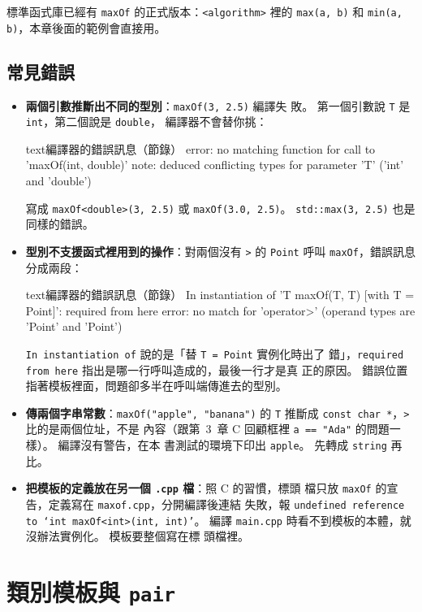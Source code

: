 標準函式庫已經有 \texttt{maxOf} 的正式版本：\texttt{<algorithm>} 裡的
\texttt{max(a, b)} 和 \texttt{min(a, b)}，本章後面的範例會直接用。

\subsection{常見錯誤}

\begin{itemize}
\item \textbf{兩個引數推斷出不同的型別}：\texttt{maxOf(3, 2.5)} 編譯失
敗。 第一個引數說 \texttt{T} 是 \texttt{int}，第二個說是 \texttt{double}，
編譯器不會替你挑：
\begin{code}{text}{編譯器的錯誤訊息（節錄）}
error: no matching function for call to 'maxOf(int, double)'
note:   deduced conflicting types for parameter 'T' ('int' and 'double')
\end{code}
寫成 \texttt{maxOf<double>(3, 2.5)} 或 \texttt{maxOf(3.0, 2.5)}。
\texttt{std::max(3, 2.5)} 也是同樣的錯誤。
\item \textbf{型別不支援函式裡用到的操作}：對兩個沒有 \texttt{>} 的
\texttt{Point} 呼叫 \texttt{maxOf}，錯誤訊息分成兩段：
\begin{code}{text}{編譯器的錯誤訊息（節錄）}
In instantiation of 'T maxOf(T, T) [with T = Point]':
  required from here
error: no match for 'operator>' (operand types are 'Point' and 'Point')
\end{code}
\texttt{In instantiation of} 說的是「替 \texttt{T = Point} 實例化時出了
錯」，\texttt{required from here} 指出是哪一行呼叫造成的，最後一行才是真
正的原因。 錯誤位置指著模板裡面，問題卻多半在呼叫端傳進去的型別。
\item \textbf{傳兩個字串常數}：\texttt{maxOf("apple", "banana")} 的
\texttt{T} 推斷成 \texttt{const char *}，\texttt{>} 比的是兩個位址，不是
內容（跟第~3~章 C 回顧框裡 \texttt{a == "Ada"} 的問題一樣）。 編譯沒有警告，在本
書測試的環境下印出 \texttt{apple}。 先轉成 \texttt{string} 再比。
\item \textbf{把模板的定義放在另一個 \texttt{.cpp} 檔}：照 C 的習慣，標頭
檔只放 \texttt{maxOf} 的宣告，定義寫在 \texttt{maxof.cpp}，分開編譯後連結
失敗，報 \texttt{undefined reference to `int maxOf<int>(int, int)'}。 編譯
\texttt{main.cpp} 時看不到模板的本體，就沒辦法實例化。 模板要整個寫在標
頭檔裡。
\end{itemize}

\section{類別模板與 \texttt{pair}}
\label{sec:class-template}

